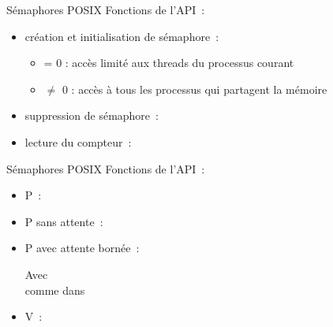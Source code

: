 \begin {frame} {Sémaphores POSIX}
    Fonctions de l'API~:

    \begin {itemize}
	\item création et initialisation de sémaphore~:


	    \vspace* {1mm}
	    \begin {itemize}
		\item {} = 0 : accès limité aux threads du processus
		    courant
		\item {} $\neq$ 0 : accès à tous
		    les processus qui partagent la mémoire 

	    \end {itemize}

	\item suppression de sémaphore~:


	\item lecture du compteur~:


    \end {itemize}

\end {frame}

\begin {frame} {Sémaphores POSIX}
    Fonctions de l'API~:

    \begin {itemize}
	\item P~:


	\item P sans attente~:


	\item P avec attente bornée~:


	    Avec
	    \\
	    \implique comme dans 

	\item V~:

    \end {itemize}

\end {frame}


